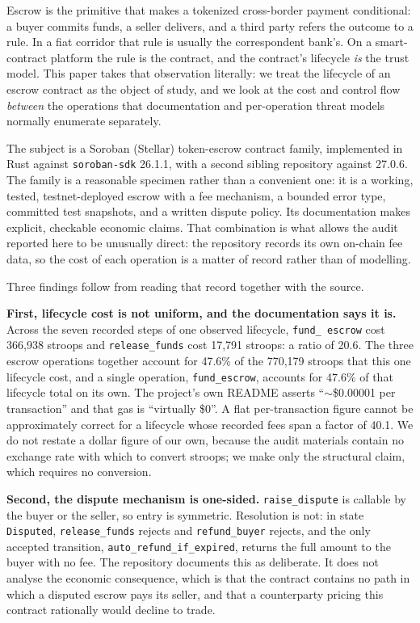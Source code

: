 \documentclass[sigconf,review]{acmart}
\begin{document}
Escrow is the primitive that makes a tokenized cross-border payment
conditional: a buyer commits funds, a seller delivers, and a third party
refers the outcome to a rule. In a fiat corridor that rule is usually the
correspondent bank's. On a smart-contract platform the rule is the contract,
and the contract's lifecycle \emph{is} the trust model. This paper takes that
observation literally: we treat the lifecycle of an escrow contract as the
object of study, and we look at the cost and control flow \emph{between} the
operations that documentation and per-operation threat models normally
enumerate separately.

The subject is a Soroban (Stellar) token-escrow contract family, implemented in
Rust against \texttt{soroban-sdk} 26.1.1, with a second sibling repository
against 27.0.6. The family is a reasonable specimen rather than a convenient
one: it is a working, tested, testnet-deployed escrow with a fee mechanism, a
bounded error type, committed test snapshots, and a written dispute policy. Its
documentation makes explicit, checkable economic claims. That combination is
what allows the audit reported here to be unusually direct: the repository
records its own on-chain fee data, so the cost of each operation is a matter of
record rather than of modelling.

Three findings follow from reading that record together with the source.

\textbf{First, lifecycle cost is not uniform, and the documentation says it
is.} Across the seven recorded steps of one observed lifecycle, \texttt{fund\_
escrow} cost 366{,}938 stroops and \texttt{release\_funds} cost 17{,}791
stroops: a ratio of 20.6. The three escrow operations together account for
47.6\% of the 770{,}179 stroops that this one lifecycle cost, and a single
operation, \texttt{fund\_escrow}, accounts for 47.6\% of that lifecycle total
on its own. The project's own README asserts ``$\sim$\$0.00001 per
transaction'' and that gas is ``virtually \$0''. A flat per-transaction figure
cannot be approximately correct for a lifecycle whose recorded fees span a
factor of 40.1. We do not restate a dollar figure of our own, because the audit
materials contain no exchange rate with which to convert stroops; we make only
the structural claim, which requires no conversion.

\textbf{Second, the dispute mechanism is one-sided.} \texttt{raise\_dispute}
is callable by the buyer or the seller, so entry is symmetric. Resolution is
not: in state \texttt{Disputed}, \texttt{release\_funds} rejects and
\texttt{refund\_buyer} rejects, and the only accepted transition,
\texttt{auto\_refund\_if\_expired}, returns the full amount to the buyer with no
fee. The repository documents this as deliberate. It does not analyse the
economic consequence, which is that the contract contains no path in which a
disputed escrow pays its seller, and that a counterparty pricing this contract
rationally would decline to trade.
\end{document}
